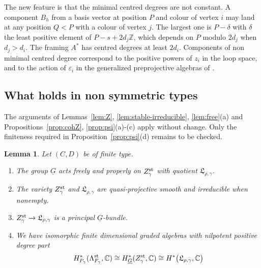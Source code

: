 \documentclass[11pt,reqno]{amsart}
\newtheorem{Lemma}[Theorem]{Lemma}
\theoremstyle{definition}
\theoremstyle{remark}
\def\bbC{\mathbb C}
\def\bbZ{\mathbb Z}
\def\dG{\underline G}
\begin{document}
The new feature is that the minimal centred degrees are not constant. 
A component $B_h$ from a basis vector at position $P$ and colour of vertex $i$ may
land at any position $Q<P$ with a colour of vertex $j$. The largest one is $P-\delta$ with $\delta$ the least positive element of
$P-s+2d_j\bbZ$, which depends on $P$ modulo $2d_j$ when $d_j>d_i$. 
The framing $A^*$ has centred degrees at least $2d_i$. 
Components of non minimal centred degree correspond to the positive powers of $z_i$ in the loop
space, and to the action of $\varepsilon_i$ in the generalized preprojective algebras of \cite{GLS}.

\subsection{What holds in non symmetric types}
The arguments of
Lemmas~\ref{lem:Z}, \ref{lem:stable-irreducible}, \ref{lem:free}(a)
and Propositions~\ref{prop:cohZ}, \ref{prop:psi}(a)-(c) apply without change.
Only the finiteness required in Proposition~\ref{prop:psi}(d)
remains to be checked.

\begin{Lemma}\label{F}
Let $(C,D)$ be of finite type.
\begin{enumerate}[label=$\mathrm{(\alph*)}$,leftmargin=8mm]
\item 
The group $\dG$ acts freely and properly on $Z^{\rm st}_\gamma$ with quotient $\mathfrak L_{\rho,\gamma}$.
\item
The variety $Z^{\rm st}_\gamma$ and $\mathfrak L_{\rho,\gamma}$ are quasi-projective smooth
and irreducible when nonempty.
\item
$Z^{\rm st}_\gamma\to \mathfrak L_{\rho,\gamma}$ is a principal $\dG$-bundle. 
\item
We have  isomorphic finite dimensional graded algebras with nilpotent positive degree part
\[
H^*_{P_\gamma}(\Lambda^{\rm st}_{F_\gamma},\bbC)\cong H^*_{\dG}(Z^{\rm st}_\gamma,\bbC)\cong H^*\big(\mathfrak L_{\rho,\gamma},\bbC\big)
\]
\end{enumerate}
\end{Lemma}
\end{document}
